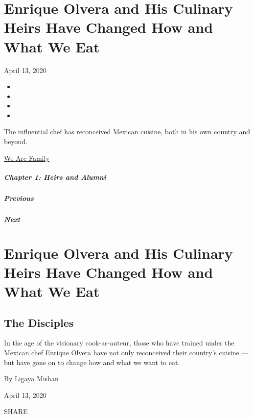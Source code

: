 \hypertarget{enrique-olvera-and-his-culinary-heirs-have-changed-how-and-what-we-eat}{%
\section{Enrique Olvera and His Culinary Heirs Have Changed How and What
We
Eat}\label{enrique-olvera-and-his-culinary-heirs-have-changed-how-and-what-we-eat}}

April 13, 2020

\begin{itemize}
\item
\item
\item
\item
\end{itemize}

The influential chef has reconceived Mexican cuisine, both in his own
country and beyond.

\href{https://www.nytimes.com/interactive/2020/04/13/t-magazine/culture-issue-2020.html}{We
Are Family}

\hypertarget{chapter-1-heirs-and-alumni}{%
\subparagraph{Chapter 1: Heirs and
Alumni}\label{chapter-1-heirs-and-alumni}}

\hypertarget{previous}{%
\subparagraph{Previous}\label{previous}}

\hypertarget{next}{%
\subparagraph{Next}\label{next}}

\hypertarget{enrique-olvera-and-his-culinary-heirs-have-changed-how-and-what-we-eat-1}{%
\section{Enrique Olvera and His Culinary Heirs Have Changed How and What
We
Eat}\label{enrique-olvera-and-his-culinary-heirs-have-changed-how-and-what-we-eat-1}}

\hypertarget{the-disciples}{%
\subsection{The Disciples}\label{the-disciples}}

In the age of the visionary cook-as-auteur, those who have trained under
the Mexican chef Enrique Olvera have not only reconceived their
country's cuisine --- but have gone on to change how and what we want to
eat.

By Ligaya Mishan

April 13, 2020

SHARE

